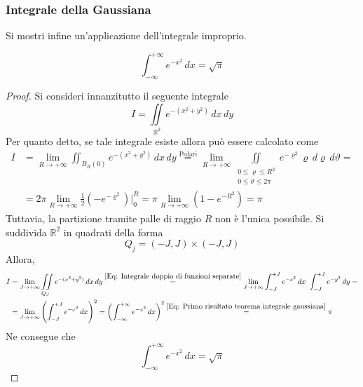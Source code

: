 \subsubsection{Integrale della Gaussiana}
Si mostri infine un'applicazione dell'integrale improprio.
\begin{theorem}
    \begin{equation*}
    \int_{-\infty}^{+\infty}{e^{-x^2}}\, dx = \sqrt{\pi}
    \end{equation*}
\end{theorem}
\begin{proof}
    Si consideri innanzitutto il seguente integrale
    \begin{equation*}
        I=\iint\limits_{\mathbb{R}^2}{e^{-(x^2+y^2)}}\,dx\,dy
    \end{equation*}
    Per quanto detto, se tale integrale esiste allora può essere calcolato come
    \begin{equation} \label{Eq: Primo risultato teorema integrale gaussiana}
    \begin{aligned}
        I&=\lim_{R \to +\infty}{\iint_{B_R(0)}{e^{-(x^2+y^2)}}}\,dx\,dy \overset{\text{Polari}}{=} \lim_{R \to +\infty}{\iint\limits_{\substack{0 \leq \varrho \leq R^2\\ 0 \leq \vartheta \leq 2\pi}}{e^{-\varrho^2} \varrho}\,d\varrho\,d\vartheta}=\\
        &= 2\pi \lim_{R \to +\infty}{\frac{1}{2}}{\left( -e^{-\varrho^2}\right) \Big|_{0}^{R}}= \pi \lim_{R \to +\infty}{(1-e^{-R^2})}= \pi
    \end{aligned}
    \end{equation}
    Tuttavia, la partizione tramite palle di raggio $R$ non è l'unica possibile. Si suddivida $\mathbb{R}^2$ in quadrati della forma
    \begin{equation*}
        Q_j=(-J,J) \times (-J, J)
    \end{equation*}
    Allora, 
    \begin{equation*}
    \begin{aligned}
        I&= \lim_{J \to +\infty}{\iint\limits_{Q_J}{e^{-(x^2+y^2)}}\,dx\,dy}\overset{\eqref{Eq: Integrale doppio di funzioni separate}}{=} \lim_{J \to +\infty}{\int_{-J}^{+J}{e^{-x^2}}\, dx\ \int_{-J}^{+J}{e^{-y^2}}\,dy}=\\
        &=\lim_{J \to + \infty}\left(\int_{-J}^{+J}{ e^{-x^2}}\,dx\right)^2 = \left(\int_{-\infty}^{+\infty}{ e^{-x^2}}\,dx\right)^2 \overset{\eqref{Eq: Primo risultato teorema integrale gaussiana}}{=} \pi
    \end{aligned}
    \end{equation*}
    Ne consegue che
    \begin{equation*}
        \int_{-\infty}^{+\infty}{e^{-x^2}}\, dx = \sqrt{\pi}
    \end{equation*}
\end{proof}